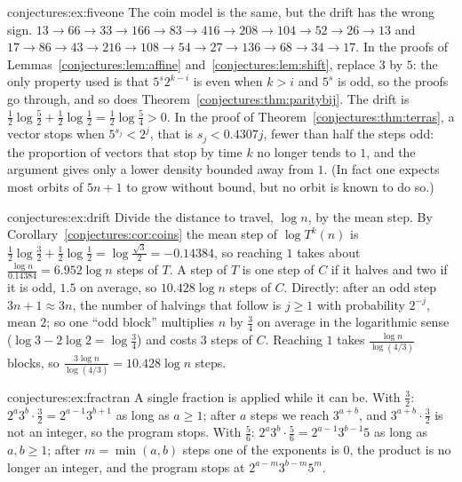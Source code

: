 \begin{solution}{conjectures:ex:fiveone}
\idea The coin model is the same, but the drift has the wrong sign.
\writeup $13\to66\to33\to166\to83\to416\to208\to104\to52\to26\to13$ and $17\to86\to43\to216\to108\to54\to27\to136\to68\to34\to17$. In the proofs of
Lemmas~\ref{conjectures:lem:affine} and~\ref{conjectures:lem:shift}, replace $3$ by $5$: the only property used is that $5^{s}2^{k-i}$ is even when $k>i$ and $5^s$ is odd, so
the proofs go through, and so does Theorem~\ref{conjectures:thm:paritybij}. The drift is $\frac12\log\frac52+\frac12\log\frac12=\frac12\log\frac54>0$. In the proof
of Theorem~\ref{conjectures:thm:terras}, a vector stops when $5^{s_j}<2^j$, that is $s_j<0.4307j$, fewer than half the steps odd: the proportion of vectors that
stop by time $k$ no longer tends to $1$, and the argument gives only a lower density bounded away from $1$. (In fact one expects most orbits of $5n+1$ to
grow without bound, but no orbit is known to do so.)
\end{solution}

\begin{solution}{conjectures:ex:drift}
\idea Divide the distance to travel, $\log n$, by the mean step.
\writeup By Corollary~\ref{conjectures:cor:coins} the mean step of $\log T^k(n)$ is $\frac12\log\frac32+\frac12\log\frac12=\log\frac{\sqrt3}2=-0.14384$, so reaching $1$
takes about $\frac{\log n}{0.14384}=6.952\log n$ steps of $T$. A step of $T$ is one step of $C$ if it halves and two if it is odd, $1.5$ on average, so
$10.428\log n$ steps of $C$. Directly: after an odd step $3n+1\approx3n$, the number of halvings that follow is $j\ge1$ with probability $2^{-j}$, mean
$2$; so one ``odd block'' multiplies $n$ by $\frac34$ on average in the logarithmic sense ($\log3-2\log2=\log\frac34$) and costs $3$ steps of $C$.
Reaching $1$ takes $\frac{\log n}{\log(4/3)}$ blocks, so $\frac{3\log n}{\log(4/3)}=10.428\log n$ steps.
\end{solution}

\begin{solution}{conjectures:ex:fractran}
\idea A single fraction is applied while it can be.
\writeup With $\frac32$: $2^a3^b\cdot\frac32=2^{a-1}3^{b+1}$ as long as $a\ge1$; after $a$ steps we reach $3^{a+b}$, and $3^{a+b}\cdot\frac32$ is not an
integer, so the program stops. With $\frac56$: $2^a3^b\cdot\frac56=2^{a-1}3^{b-1}5$ as long as $a,b\ge1$; after $m=\min(a,b)$ steps one of the
exponents is $0$, the product is no longer an integer, and the program stops at $2^{a-m}3^{b-m}5^m$.
\end{solution}

